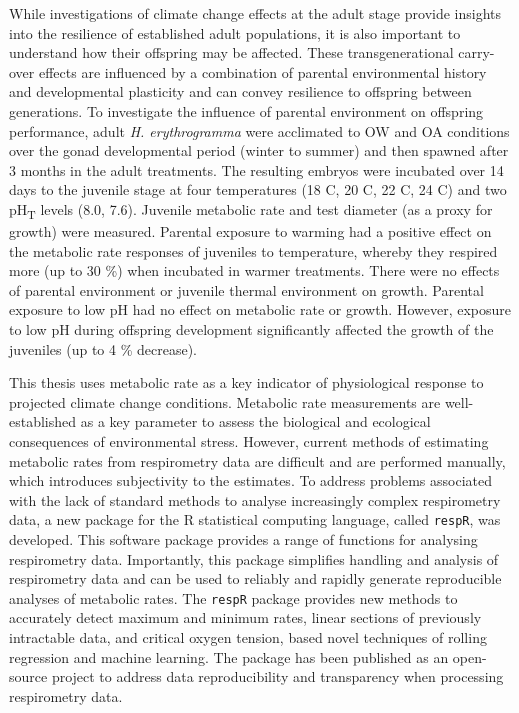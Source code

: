 While investigations of climate change effects at the adult stage provide insights into the resilience of established adult populations, it is also important to understand how their offspring may be affected.
These transgenerational carry-over effects are influenced by a combination of parental environmental history and developmental plasticity and can convey resilience to offspring between generations.
To investigate the influence of parental environment on offspring performance, adult \textit{H. erythrogramma} were acclimated to OW and OA conditions over the gonad developmental period (winter to summer) and then spawned after 3 months in the adult treatments.
The resulting embryos were incubated over 14 days to the juvenile stage at four temperatures (18 \degree C, 20 \degree C, 22 \degree C, 24 \degree C) and two pH\textsubscript{T} levels (8.0, 7.6).
Juvenile metabolic rate and test diameter (as a proxy for growth) were measured.
Parental exposure to warming had a positive effect on the metabolic rate responses of juveniles to temperature, whereby they respired more (up to 30 \%) when incubated in warmer treatments.
There were no effects of parental environment or juvenile thermal environment on growth.
Parental exposure to low pH had no effect on metabolic rate or growth. 
However, exposure to low pH during offspring development significantly affected the growth of the juveniles (up to 4 \% decrease).

This thesis uses metabolic rate as a key indicator of physiological response to projected climate change conditions.
Metabolic rate measurements are well-established as a key parameter to assess the biological and ecological consequences of environmental stress. 
However, current methods of estimating metabolic rates from respirometry data are difficult and are performed manually, which introduces subjectivity to the estimates.
To address problems associated with the lack of standard methods to analyse increasingly complex respirometry data, a new package for the R statistical computing language, called \texttt{respR}, was developed.
This software package provides a range of functions for analysing respirometry data.
Importantly, this package simplifies handling and analysis of respirometry data and can be used to reliably and rapidly generate reproducible analyses of metabolic rates.
The \texttt{respR} package provides new methods to accurately detect maximum and minimum rates, linear sections of previously intractable data, and critical oxygen tension, based novel techniques of rolling regression and machine learning.
The package has been published as an open-source project to address data reproducibility and transparency when processing respirometry data.


